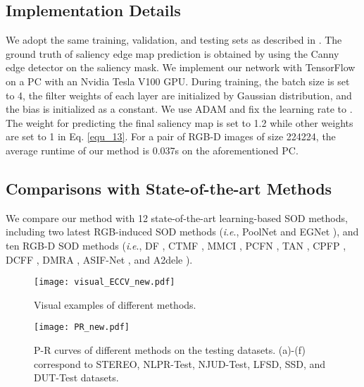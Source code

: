 \documentclass[runningheads]{llncs}
\newcommand{\ie}{\textit{i}.\textit{e}.}
\begin{document}
\subsection{Implementation Details}
We adopt the same training, validation, and testing sets as described in \cite{DMRA,A2dele}. The ground truth of saliency edge map prediction is obtained by using the Canny edge detector on the saliency mask. We implement our network with TensorFlow on a PC with an Nvidia Tesla V100 GPU. During training, the batch size is set to 4, the filter weights of each layer are initialized by Gaussian distribution, and the bias is initialized as a constant. We use ADAM and fix the learning rate to . The weight  for predicting the final saliency map is set to 1.2 while other weights are set to 1 in Eq. \eqref{equ_13}. For a pair of RGB-D images of size 224224, the average runtime of our method is 0.037s on the aforementioned PC.



\subsection{Comparisons with State-of-the-art Methods}
We compare our method with 12 state-of-the-art learning-based SOD methods, including two latest RGB-induced SOD methods (\ie, PoolNet \cite{PoolNet} and EGNet \cite{EGNet}), and ten RGB-D SOD methods (\ie, DF \cite{DF}, CTMF \cite{CTMF}, MMCI \cite{MMCI}, PCFN \cite{PCFN}, TAN \cite{TAN}, CPFP \cite{CPFP}, DCFF \cite{DCFF}, DMRA \cite{DMRA}, ASIF-Net \cite{ASIF-Net}, and A2dele \cite{A2dele}).

\begin{figure*}[!t]
	\centering
	\texttt{[image: visual\_ECCV\_new.pdf]}
	\caption{Visual examples of different methods.}
	\label{visual}
\end{figure*}

\begin{figure*}[!t]
	\centering
	\texttt{[image: PR\_new.pdf]}
	\caption{P-R curves of different methods on the testing datasets. (a)-(f) correspond to STEREO, NLPR-Test, NJUD-Test, LFSD, SSD, and DUT-Test datasets. }
	\label{PR}
\end{figure*}
\end{document}
